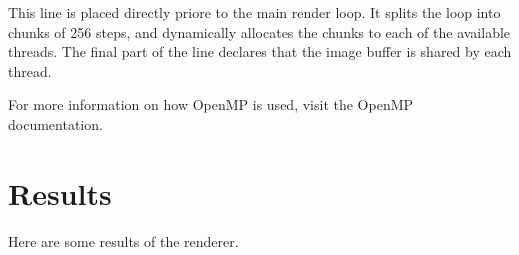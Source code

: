 \documentclass{amsart}
\begin{document}
This line is placed directly priore to the main render loop. It splits the loop
into chunks of 256 steps, and dynamically allocates the chunks to each of the
available threads. The final part of the line declares that the image buffer is
shared by each thread.

For more information on how OpenMP is used, visit the OpenMP documentation.

\section{Results}%
\label{sec:Results}

Here are some results of the renderer.
\end{document}
